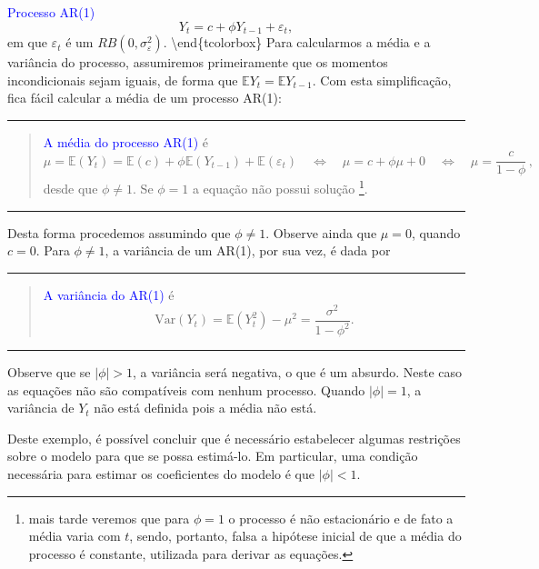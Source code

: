 \documentclass[
]{book}
\theoremstyle{definition}
\theoremstyle{definition}
\theoremstyle{definition}
\theoremstyle{remark}
\begin{document}
\textcolor{blue}{ Processo AR(1)}
\[
   Y_t = c + \phi Y_{t-1}+\varepsilon_t,
\]
em que \(\varepsilon_t\) é um \(RB(0,\sigma_\varepsilon^2)\).
\textbackslash end\{tcolorbox\}
Para calcularmos a média e a variância do processo, assumiremos primeiramente que os momentos incondicionais sejam iguais, de forma que \(\mathbb{E} Y_t=\mathbb{E} Y_{t-1}\). Com esta simplificação, fica fácil calcular a média de um processo AR(1):

\begin{center}\rule{0.5\linewidth}{0.5pt}\end{center}

\begin{quote}
\textcolor{blue}{ A média do processo AR(1)} é
\[
\mu= \mathbb{E} (Y_t)=\mathbb{E}(c) +\phi\mathbb{E} (Y_{t-1})+\mathbb{E}(\varepsilon_t)\quad\Longleftrightarrow\quad \mu=c+\phi\mu+0\quad\Longleftrightarrow\quad\mu=\frac{c}{1-\phi}\,,\]
desde que \(\phi\neq 1\). Se \(\phi=1\) a equação não possui solução \footnote{mais tarde veremos que para $\phi=1$ o processo é não estacionário e de fato  a média varia com $t$, sendo, portanto, falsa a hipótese inicial de que a média do processo é constante, utilizada para derivar as equações.}.
\end{quote}

\begin{center}\rule{0.5\linewidth}{0.5pt}\end{center}

Desta forma procedemos assumindo que \(\phi\neq 1\). Observe ainda que \(\mu=0\), quando \(c=0\). Para \(\phi\neq 1\), a variância de um AR(1), por sua vez, é dada por

\begin{center}\rule{0.5\linewidth}{0.5pt}\end{center}

\begin{quote}
\textcolor{blue}{ A variância do AR(1)} é
\[
\mbox{Var}(Y_t)=\mathbb{E}(Y_t^2)-\mu^2=\frac{\sigma^2}{1-\phi^2}.
\]
\end{quote}

\begin{center}\rule{0.5\linewidth}{0.5pt}\end{center}

Observe que se \(|\phi|>1\), a variância será negativa, o que é um absurdo. Neste caso as equações não são compatíveis com nenhum processo.
Quando \(|\phi|=1\), a variância de \(Y_t\) não está definida pois a média não está.

Deste exemplo, é possível concluir que é necessário estabelecer algumas restrições sobre o modelo para que se possa estimá-lo. Em particular,
uma condição necessária para estimar os coeficientes do modelo é que \(|\phi|<1\).
\end{document}
